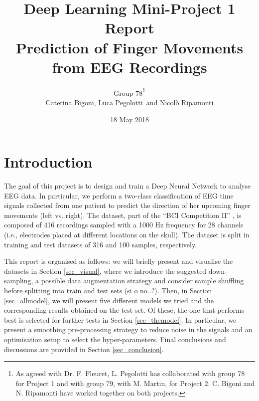 \documentclass{article}
\begin{document}
\title{Deep Learning Mini-Project 1 Report \\ Prediction of Finger Movements from EEG Recordings}
\author{Group 78\footnote{As agreed with Dr. F. Fleuret, L. Pegolotti has collaborated with group 78 for Project 1 and with group 79, with M. Martin, for Project 2. C. Bigoni and N. Ripamonti have worked together on both projects.}\\ Caterina Bigoni, Luca Pegolotti \,and Nicol\`o Ripamonti}
\date{18 May 2018}
\maketitle





\section{Introduction}
 The goal of this project is to design and train a Deep Neural Network to analyse EEG data. 
 In particular, we perform a two-class classification of EEG time signals collected from one patient to predict the direction of her upcoming finger movements (left vs. right). 
 The  dataset, part of the ``BCI Competition II'' \cite{bci_ii}, is composed of 416 recordings  sampled with a 1000 Hz frequency for 28 channels (i.e., electrodes placed at different locations on the skull).
The dataset is split in training and test datasets of 316 and 100 samples, respectively. 

This report is organised as follows: we will briefly present and visualise the datasets in Section \ref{sec_visual}, where we introduce the suggested down-sampling, a possible  data augmentation strategy and consider sample shuffling before splitting into train and test sets (si o no..?). 
Then, in Section \ref{sec_allmodel}, we will present five different models we tried and the corresponding results obtained on the test set.
Of these, the one that performs best is selected for further tests in Section \ref{sec_themodel}. 
In particular, we present a smoothing pre-processing strategy to reduce noise in the signals and  an optimisation setup to select the hyper-parameters.  
Final conclusions and discussions are provided in Section \ref{sec_conclusion}. 

\end{document}
